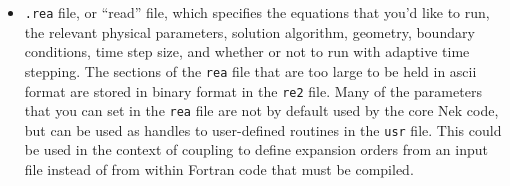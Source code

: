 \documentclass[10pt]{article}
\numberwithin{equation}{section} %
\begin{document}
\begin{itemize}

\item {\tt .rea} file, or ``read'' file, which specifies the equations that you'd like to run, the relevant physical parameters, solution algorithm, geometry, boundary conditions, time step size, and whether or not to run with adaptive time stepping. The sections of the {\tt rea} file that are too large to be held in ascii format are stored in binary format in the {\tt re2} file. Many of the parameters that you can set in the {\tt rea} file are not by default used by the core Nek code, but can be used as handles to user-defined routines in the {\tt usr} file. This could be used in the context of coupling to define expansion orders from an input file instead of from within Fortran code that must be compiled.


\end{itemize}
\end{document}
